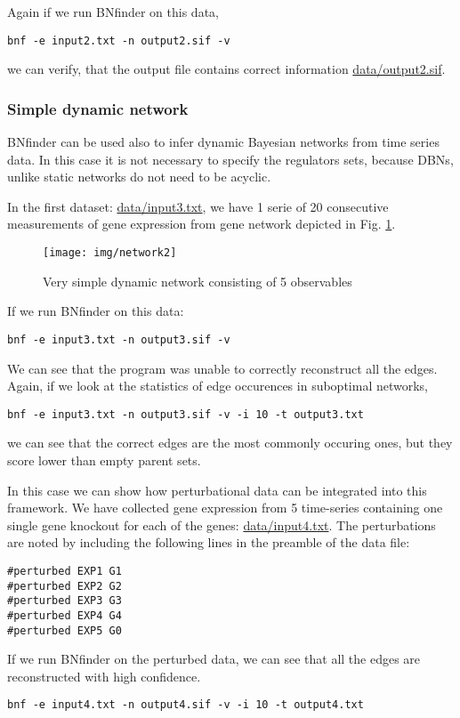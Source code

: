Again if we run BNfinder on this data, 
\begin{verbatim}
bnf -e input2.txt -n output2.sif -v
\end{verbatim}
we can verify, that the output file contains correct information \url{data/output2.sif}.

\subsubsection{Simple dynamic network}
\label{sec:simdyn}

BNfinder can be used also to infer dynamic Bayesian networks from time
series data. In this case it is not necessary to specify the
regulators sets, because DBNs, unlike static networks do not need to
be acyclic.

In the first dataset: \url{data/input3.txt}, we have 1 serie of 20
consecutive measurements of gene expression from gene network depicted
in Fig. \ref{fig:net2}.

\begin{figure}[h]
  \centering
  \texttt{[image: img/network2]}  
  \caption{Very simple dynamic network consisting of 5 observables}
  \label{fig:net2}
\end{figure}

If we run BNfinder on this data:
\begin{verbatim}
bnf -e input3.txt -n output3.sif -v 
\end{verbatim}
We can see that the program was unable to correctly reconstruct all
the edges. Again, if we look at the statistics of edge occurences in
suboptimal networks,
\begin{verbatim}
bnf -e input3.txt -n output3.sif -v -i 10 -t output3.txt
\end{verbatim}
we can see that the correct edges are the most commonly occuring ones,
but they score lower than empty parent sets.

In this case we can show how perturbational data can be integrated
into this framework. We have collected gene expression from 5
time-series containing one single gene knockout for each of the genes:
\url{data/input4.txt}. The perturbations are noted by including the
following lines in the preamble of the data file:
\begin{verbatim}
#perturbed EXP1 G1
#perturbed EXP2 G2
#perturbed EXP3 G3
#perturbed EXP4 G4
#perturbed EXP5 G0
\end{verbatim}

If we run BNfinder on the perturbed data, we can see that all the edges
are reconstructed with high confidence.
\begin{verbatim}
bnf -e input4.txt -n output4.sif -v -i 10 -t output4.txt
\end{verbatim}

